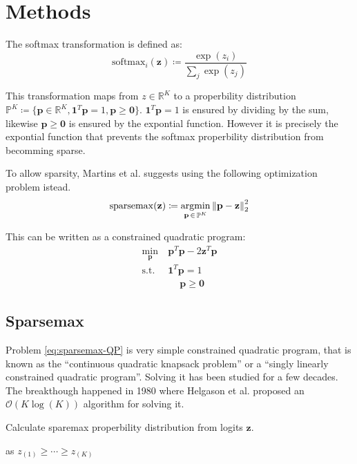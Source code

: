 \section{Methods}

The softmax transformation is defined as:
\begin{equation}
\mathrm{softmax}_i(\mathbf{z}) \coloneqq \frac{\exp(z_i)}{\sum_{j} \exp(z_j)}
\end{equation}

This transformation maps from $z \in \mathbb{R}^K$ to a properbility distribution $\mathbb{P}^K \coloneqq \{ \mathbf{p} \in \mathbb{R}^K,  \mathbf{1}^T \mathbf{p} = 1, \mathbf{p} \ge \mathbf{0} \}$. $\mathbf{1}^T \mathbf{p} = 1$ is ensured by dividing by the sum, likewise $\mathbf{p} \ge \mathbf{0}$ is ensured by the expontial function. However it is precisely the expontial function that prevents the softmax properbility distribution from becomming sparse.

To allow sparsity, Martins et al. \cite{sparsemax} suggests using the following optimization problem istead.
\begin{equation}
\mathrm{sparsemax}(\mathbf{z}) \coloneqq \operatorname*{argmin}_{\mathbf{p}\, \in\, \mathbb{P}^K} \left\lVert \mathbf{p} - \mathbf{z} \right\rVert_2^2 
\end{equation}

This can be written as a constrained quadratic program:
\begin{equation}
\begin{aligned}
\min_{\mathbf{p}}\ &\mathbf{p}^T \mathbf{p} - 2 \mathbf{z}^T \mathbf{p} \\
\text{s.t. } &\mathbf{1}^T \mathbf{p} = 1 \\
&\quad\ \mathbf{p} \ge \mathbf{0}
\end{aligned}
\label{eq:sparsemax-QP}
\end{equation}

\subsection{Sparsemax}
Problem \eqref{eq:sparsemax-QP} is very simple constrained quadratic program, that is known as the ``continuous quadratic knapsack problem'' or a ``singly linearly constrained quadratic program''. Solving it has been studied for a few decades. The breakthough happened in 1980 where Helgason et al. \cite{Helgason1980} proposed an $\mathcal{O}(K \log(K))$ algorithm for solving it.
\begin{algorithm}[H]
  \caption{Calculate sparemax properbility distribution from logits $\mathbf{z}$.}
  \begin{algorithmic}[1]
      \State {} as $z_{(1)} \ge \cdots \ge z_{(K)}$
      \State {}
    \EndFunction
  \end{algorithmic}
\end{algorithm}

